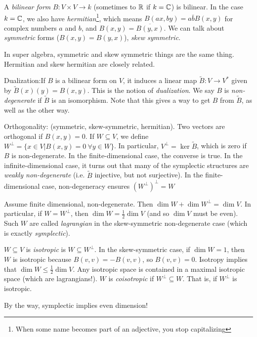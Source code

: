    A \emph{bilinear form} $B:V\times V\to k$ (sometimes to
   $\mathbb{R}$ if $k=\mathbb{C}$) is bilinear.  In the case $k=\mathbb{C}$, we
   also have \emph{hermitian}\footnote{When some name becomes part
   of an adjective, you stop capitalizing}, which means $B(ax,by)
   = a\bar b B(x,y)$ for complex numbers $a$ and $b$, and
   $B(x,y)=\overline{B(y,x)}$. We can talk about \emph{symmetric}
   forms ($B(x,y)=B(y,x)$), \emph{skew symmetric}.

  In super algebra, symmetric and skew symmetric things are the
  same thing.  Hermitian and skew hermitian are closely related.

 Dualization:If $B$ is a bilinear form on $V$, it induces a linear map
  $\tilde B: V\to V^*$ given by $\tilde B(x)(y)=B(x,y)$.  This is
  the notion of \emph{dualization}.  We say $B$ is
  \emph{non-degenerate} if $\tilde B$ is an isomorphism.  Note
  that this gives a way to get $B$ from $\tilde B$, as well as the
  other way.

  Orthogonality: (symmetric, skew-symmetric, hermitian).  Two
  vectors are orthogonal if $B(x,y)=0$.  If $W\subseteq V$, we
  define $W^{\perp} = \{x\in V|B(x,y)=0\ \forall y\in W\}$.  In
  particular, $V^{\perp}=\ker \tilde B$, which is zero if $B$ is
  non-degenerate.  In the finite-dimensional case, the converse is
  true.  In the infinite-dimensional case, it turns out that many
  of the symplectic structures are \emph{weakly non-degenerate}
  (i.e. $\tilde B$ injective, but not surjective).  In the
  finite-dimensional case, non-degeneracy ensures
  $(W^{\perp})^{\perp}=W$

  Assume finite dimensional, non-degenerate.  Then $\dim W + \dim
  W^{\perp}=\dim V$.  In particular, if $W=W^{\perp}$, then $\dim
  W=\frac{1}{2} \dim V$ (and so $\dim V$ must be even).  Such $W$
  are called \emph{lagrangian} in the skew-symmetric non-degenerate case
  (which is exactly \emph{symplectic}).

  $W\subseteq V$ is \emph{isotropic} is $W\subseteq W^{\perp}$.
  In the skew-symmetric case, if $\dim W=1$, then $W$ is isotropic
  because $B(v,v)=-B(v,v)$, so $B(v,v)=0$.  Isotropy implies that
  $\dim W\le \frac{1}{2} \dim V$.  Any isotropic space is
  contained in a maximal isotropic space (which are lagrangians!).
  $W$ is \emph{coisotropic} if $W^{\perp}\subseteq W$.  That is,
  if $W^{\perp}$ is isotropic.

 By the way, symplectic implies even dimension!

